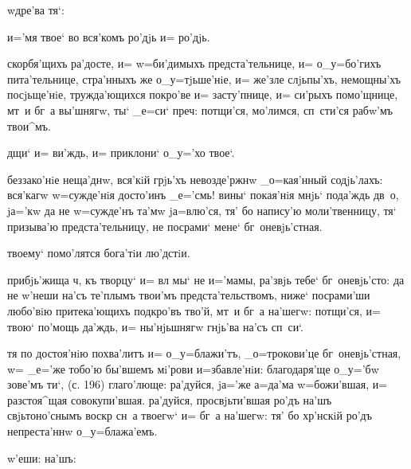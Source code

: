 
  w\т дре'ва тя`:

  и='мя твое` во вся'комъ ро'дjь и= 
ро'дjь.

 скорбя'щихъ ра'досте, и= w=би'димыхъ 
предста'тельнице, и= о_у=бо'гихъ пита'тельнице, 
стра'нныхъ же о_у=тjьше'нiе, и= же'зле слjьпы'хъ, 
немощны'хъ посjьще'нiе, тружда'ющихся покро'ве и= 
засту'пнице, и= си'рыхъ помо'щнице, мт~и бг~а вы'шнягw, 
ты` _е=си` преч: потщи'ся, мо'лимся, сп~сти'ся 
рабw'мъ твои^мъ.

  дщи` и= ви'ждь, и= приклони` 
о_у='хо твое`.

 беззако'нiе неща'днw, вся'кiй грjь'хъ 
невозде'ржнw _о=кая'нный содjь'лахъ: вся'кагw w=сужде'нiя 
досто'инъ _е='смь! вины` покая'нiя мнjь` пода'ждь дв~о, 
jа='кw да не w=сужде'нъ та'мw jа=влю'ся, тя' бо напису'ю 
моли'твенницу, тя` призыва'ю предста'тельницу, не 
посрами` мене` бг~оневjь'стная.

  твоему` помо'лятся бога'тiи 
лю'дстiи.

 прибjь'жища ч, къ творцу` и= вл 
мы` не и='мамы, ра'звjь тебе` бг~оневjь'сто: да не 
w'неши на'съ те'плымъ твои'мъ предста'тельствомъ, 
ниже` посрами'ши любо'вiю притека'ющихъ под\ъ кро'въ 
тво'й, мт~и бг~а на'шегw: потщи'ся, и= твою` по'мощь 
да'ждь, и= ны'нjьшнягw гнjь'ва на'съ сп~си`.


 тя по достоя'нiю похва'литъ и= о_у=блажи'тъ, 
_о=трокови'це бг~оневjь'стная, w= _е='же тобо'ю бы'вшемъ 
мi'рови и=збавле'нiи: благодаря'ще о_у='бw зове'мъ ти`, 
(с. 196) глаго'люще: ра'дуйся, jа='же а=да'ма 
w=божи'вшая, и= разстоя^щая совокупи'вшая. ра'дуйся, 
просвjьти'вшая ро'дъ на'шъ свjьтоно'снымъ воскр 
сн~а твоегw` и= бг~а на'шегw: тя' бо хр'нскiй ро'дъ 
непреста'ннw о_у=блажа'емъ.

  w'еши:     на'шъ: 
